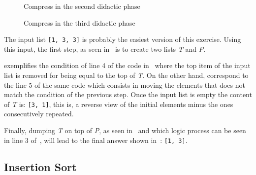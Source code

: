 \begin{figure}[h!]
  \centering
  \caption{Compress in the second didactic phase}
\end{figure}

\begin{figure}[h!]
  \centering
  \caption{Compress in the third didactic phase}
\end{figure}

The input list \texttt{[1, 3, 3]} is probably the easiest version of
this exercise. Using this input, the first step, as seen
in~ is to create two lists
\emph{T} and \emph{P}.

 exemplifies the condition of
line 4 of the \erlang code in~ where the top
item of the input list is removed for being equal to the top of
\emph{T}. On the other hand, 
correspond to the line 5 of the same code which consists in moving
the elements that does not match the condition of the previous step.
Once the input list is empty the content of \emph{T} is:
\texttt{[3, 1]}, this is, a reverse view of the initial elements minus
the ones consecutively repeated.

Finally, dumping \emph{T} on top of \emph{P}, as seen
in~ and which logic process
can be seen in line 3 of~, will lead to the final
answer shown in~: \texttt{[1, 3]}.

\FloatBarrier
\subsection{Insertion Sort}

